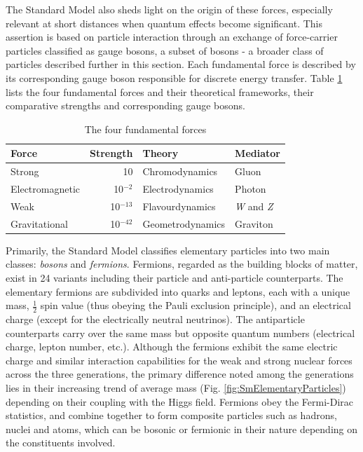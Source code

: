 The Standard Model also sheds light on the origin of these forces, especially relevant at short distances when quantum effects become significant. This
assertion is based on particle interaction through an exchange of force-carrier particles classified as gauge bosons, a subset of bosons - a broader
class of particles described further in this section. Each fundamental force is
described by its corresponding gauge boson responsible for discrete energy transfer. Table \ref{tab:GriffithsSmTable} lists the four fundamental
forces and their theoretical frameworks, their comparative strengths and corresponding gauge bosons.

\begin{table}
  \centering
  \begin{tabular}{lrll}
    Force           & Strength   & Theory           & Mediator\tabularnewline
    \hline
    Strong          & 10         & Chromodynamics   & Gluon\tabularnewline
    Electromagnetic & 10$^{-2}$  & Electrodynamics  & Photon\tabularnewline
    Weak            & 10$^{-13}$ & Flavourdynamics  & \textsl{W} and \textsl{Z}\tabularnewline
    Gravitational   & 10$^{-42}$ & Geometrodynamics & Graviton\tabularnewline
    \hline
  \end{tabular}
  \caption{The four fundamental forces\cite{GriffithsSmTable:2008}}
  \label{tab:GriffithsSmTable}
\end{table}

Primarily, the Standard Model classifies elementary particles into two main classes: \textit{bosons} and \textit{fermions}. Fermions, regarded as the
building blocks of matter, exist in 24 variants including their particle and anti-particle counterparts. The elementary fermions are subdivided
into quarks and leptons, each with a unique mass, ${\textstyle \frac{1}{2}}$ spin value (thus obeying the Pauli exclusion principle), and an
electrical charge (except for the electrically neutral neutrinos). The antiparticle counterparts carry over the same mass but opposite quantum
numbers (electrical charge, lepton number, etc.). Although the fermions exhibit the same electric charge and similar interaction capabilities for the
weak and strong nuclear forces across the three generations, the primary difference noted among the generations lies in their increasing trend of
average mass (Fig. \ref{fig:SmElementaryParticles}) depending on their coupling with the Higgs field.
Fermions obey the Fermi-Dirac statistics, and combine together to form composite particles such as hadrons, nuclei and atoms, which can be bosonic or fermionic in their nature depending
on the constituents involved.


